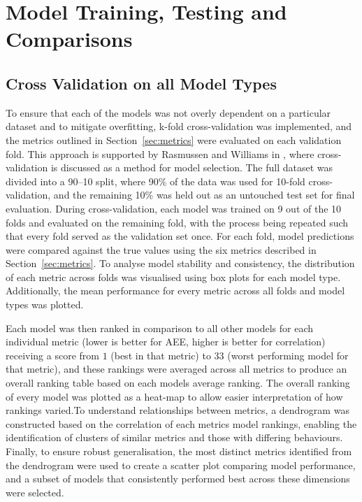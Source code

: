 \documentclass{ucdgradtaughtthesis}
\begin{document}
\section{Model Training, Testing and Comparisons}
%
%
\subsection{Cross Validation on all Model Types}
To ensure that each of the models was not overly dependent on a particular dataset and to mitigate overfitting, 
k-fold cross-validation was implemented, and the metrics outlined in Section~\ref{sec:metrics} were evaluated on each validation fold. 
This approach is supported by Rasmussen and Williams in \cite[Ch.~5]{bible}, where cross-validation is discussed as a method for model selection.
The full dataset was divided into a 90--10 split, where 90\% of the data was used for 10-fold cross-validation, and the remaining 10\% was held out 
as an untouched test set for final evaluation. During cross-validation, each model was trained on 9 out of the 10 folds and evaluated on the remaining fold, 
with the process being repeated such that every fold served as the validation set once. For each fold, model predictions were compared against the true values using the six metrics
described in Section~\ref{sec:metrics}.
To analyse model stability and consistency, the distribution of each metric across folds was visualised using box plots for each model type. Additionally, the mean performance for every metric 
across all folds and model types was plotted.

Each model was then ranked in comparison to all other models for each individual metric (lower is better for AEE, higher is better for correlation) receiving a score from \(1\) (best in that metric)
to \(33\) (worst performing model for that metric), and these rankings were averaged across all metrics to produce an overall ranking table based on each models average ranking.
The overall ranking of every model was plotted as a heat-map to allow easier interpretation
of how rankings varied.To understand relationships between metrics, a dendrogram was constructed based on the correlation of each metrics model rankings, 
enabling the identification of clusters of similar metrics and those with differing behaviours. 
Finally, to ensure robust generalisation, the most distinct metrics identified from the dendrogram were used to 
create a scatter plot comparing model performance, and a subset of models that consistently performed best across these dimensions were selected.
\end{document}
